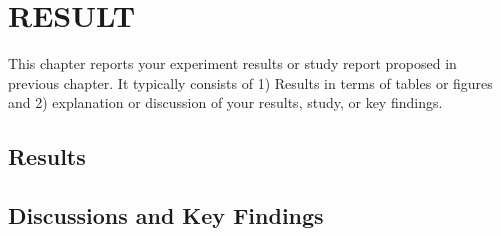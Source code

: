 \chapter{RESULT}
This chapter reports your experiment results or study report proposed in previous chapter. It typically consists of 1) Results in terms of tables or figures and 2) explanation or discussion of your results, study, or key findings.

\section{Results}

\section{Discussions and Key Findings}


